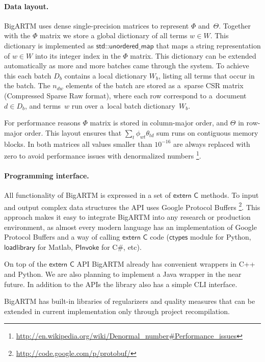 \documentclass[russian]{llncs}
\newcommand{\kw}[1]{\textsf{#1}}
\begin{document}
\paragraph{Data layout.}
BigARTM uses dense single-precision matrices to represent $\Phi$ and~$\Theta$.
Together with the $\Phi$ matrix we store a global dictionary of all terms ${w \in W}$.
This dictionary is implemented as $\kw{std::unordered\_map}$ that maps a string representation of ${w \in W}$
into its integer index in the $\Phi$ matrix.
This dictionary can be extended automatically as more and more batches came through the system.
To achieve this each batch $D_b$ contains a local dictionary $W_b$, listing all terms that occur in the batch.
The $n_{dw}$ elements of the batch are stored as a~sparse CSR matrix (Compressed Sparse Raw format),
where each row correspond to a~document ${d \in D_b}$,
and terms~$w$ run over a~local batch dictionary~$W_b$.

For performance reasons $\Phi$ matrix is stored in column-major order, and $\Theta$ in row-major order.
This layout ensures that $\sum_t \phi_{wt} \theta_{td}$ sum runs on contiguous memory blocks.
In both matrices all values smaller than $10^{-16}$ are always replaced with zero to avoid performance issues with denormalized numbers%
\footnote{\url{http://en.wikipedia.org/wiki/Denormal_number#Performance_issues}}.

\paragraph{Programming interface.}
All functionality of BigARTM is expressed in a set of $\kw{extern C}$ methods.
To input and output complex data structures the API uses Google Protocol Buffers%
\footnote{\url{http://code.google.com/p/protobuf/}}.
This approach makes it easy to integrate BigARTM into any research or production environment,
as almost every modern language has an implementation of Google Protocol Buffers
and a way of calling $\kw{extern C}$ code
($\kw{ctypes}$ module for Python, $\kw{loadlibrary}$ for Matlab, $\kw{PInvoke}$ for C\#, etc).

On top of the $\kw{extern C}$ API BigARTM already has convenient wrappers in C++ and Python.
We are also planning to implement a Java wrapper in the near future.
In addition to the APIs the library also has a simple CLI interface.

BigARTM has built-in libraries of regularizers and quality measures
that can be extended in current implementation only through project recompilation.
\end{document}
